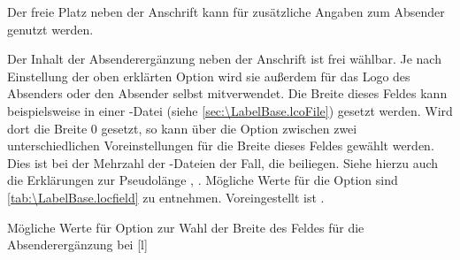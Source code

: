 \iffalse%
Insbesondere bei Geschäftsbriefen reicht der Platz im Briefkopf und im
Seitenfuß oftmals nicht aus, um alle Angaben des Absenders unterzubringen. Für
die zusätzlichen Informationen kann der Platz neben der Anschrift
genutzt werden. In dieser Anleitung wird dieses Feld \emph{Absenderergänzung}
genannt.%
\else%
\iffalse%
Reicht der Raum in Briefkopf und Seitenfuß nicht aus, um alle Angaben zum
Absender unterzubringen, kann der Platz neben der Anschrift als
\emph{Absenderergänzung} genutzt werden.%
\else%
Der freie Platz neben der Anschrift kann für zusätzliche Angaben zum Absender
genutzt werden.%
\fi%
\fi

\begin{Declaration}
\end{Declaration}
%
Der Inhalt der Absenderergänzung neben der Anschrift ist frei wählbar.
Je nach Einstellung der
oben erklärten Option  wird sie außerdem
für das Logo des Absenders oder den Absender selbst mitverwendet. Die Breite
dieses Feldes kann beispielsweise in einer -Datei (siehe
\autoref{sec:\LabelBase.lcoFile}) gesetzt werden. Wird dort die Breite 0
gesetzt, so kann über die Option  zwischen zwei
unterschiedlichen Voreinstellungen für die Breite dieses Feldes gewählt
werden. Dies ist bei der Mehrzahl der -Dateien der Fall, die
\KOMAScript{} beiliegen. Siehe hierzu auch die Erklärungen zur Pseudolänge
,
. Mögliche Werte für die Option
sind \autoref{tab:\LabelBase.locfield} zu
entnehmen. Voreingestellt ist .
%
\begin{table}
  \setcapindent{0pt}%
  \begin{captionbeside}
    {Mögliche Werte für Option  zur Wahl der Breite des
      Feldes für die Absenderergänzung bei %
      \label{tab:\LabelBase.locfield}}%
    [l]
    \begin{minipage}[t]{.55\linewidth}
      \begin{desctabular}[t]
      \end{desctabular}
    \end{minipage}
  \end{captionbeside}
\end{table}


